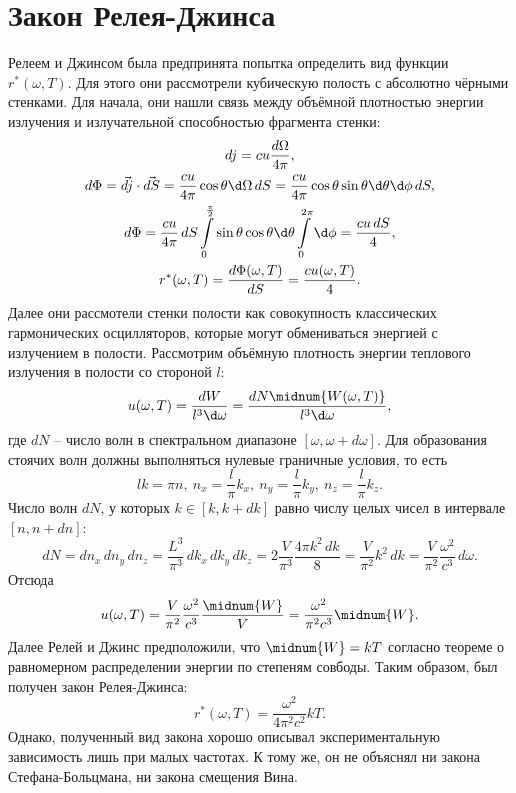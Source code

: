 \section{Закон Релея-Джинса}
Релеем и Джинсом была предпринята попытка определить вид функции
\( r^*(\omega, T) \). Для этого они рассмотрели кубическую полость с абсолютно
чёрными стенками. Для начала, они нашли связь между объёмной плотностью энергии
излучения и излучательной способностью фрагмента стенки:
\begin{gather*}
    dj = cu\frac{d\Omega}{4\pi},\\
    d\Phi = \vec{dj}\cdot\vec{dS} = \frac{cu}{4\pi}\cos\theta\d\Omega\,dS =
    \frac{cu}{4\pi}\cos\theta\sin\theta\d\theta\d\phi\,dS,\\
    d\Phi = \frac{cu}{4\pi}\,dS\int\limits_0^\frac{\pi}{2}\sin\theta\cos\theta
    \d\theta\int\limits_0^{2\pi}\d\phi = \frac{cu\,dS}{4},\\
    r^*(\omega, T) = \frac{d\Phi(\omega, T)}{dS} = \frac{cu(\omega, T)}{4}.
\end{gather*}
Далее они рассмотели стенки полости как совокупность классических гармонических
осцилляторов, которые могут обмениваться энергией с излучением в полости.
Рассмотрим объёмную плотность энергии теплового излучения в полости со стороной
\( l \):
\[
    u(\omega, T) = \frac{dW}{l^3\d\omega} =
    \frac{dN\midnum{W(\omega, T)}}{l^3\d\omega},
\]
где \( dN \) -- число волн в спектральном диапазоне
\( [\omega, \omega+d\omega] \). Для образования стоячих волн должны выполняться
нулевые граничные условия, то есть
\[
    lk = \pi n,\ n_x = \frac{l}{\pi}k_x,\ n_y = \frac{l}{\pi}k_y,\ 
    n_z = \frac{l}{\pi}k_z.
\]
Число волн \( dN \), у которых \( k\in[k, k+dk] \) равно числу целых чисел в 
интервале \( [n, n+dn] \):
\[
    dN = dn_x\,dn_y\,dn_z = \frac{L^3}{\pi^3}\,dk_x\,dk_y\,dk_z =
    2\frac{V}{\pi^3}\frac{4\pi k^2\,dk}{8} = \frac{V}{\pi^2}k^2\,dk =
    \frac{V}{\pi^2}\frac{\omega^2}{c^3}\,d\omega.
\]
Отсюда
\[
    u(\omega, T) =
    \frac{V}{\pi^2}\frac{\omega^2}{c^3}\frac{\midnum{W}}{V} =
    \frac{\omega^2}{\pi^2c^3}\midnum{W}.
\]
Далее Релей и Джинс предположили, что \( \midnum{W} = kT \) согласно
теореме о равномерном распределении энергии по степеням совбоды. Таким образом,
был получен закон Релея-Джинса:
\[
    r^*(\omega, T) = \frac{\omega^2}{4\pi^2c^2}kT.
\]
Однако, полученный вид закона хорошо описывал экспериментальную зависимость лишь
при малых частотах. К тому же, он не объяснял ни закона Стефана-Больцмана, ни
закона смещения Вина.
